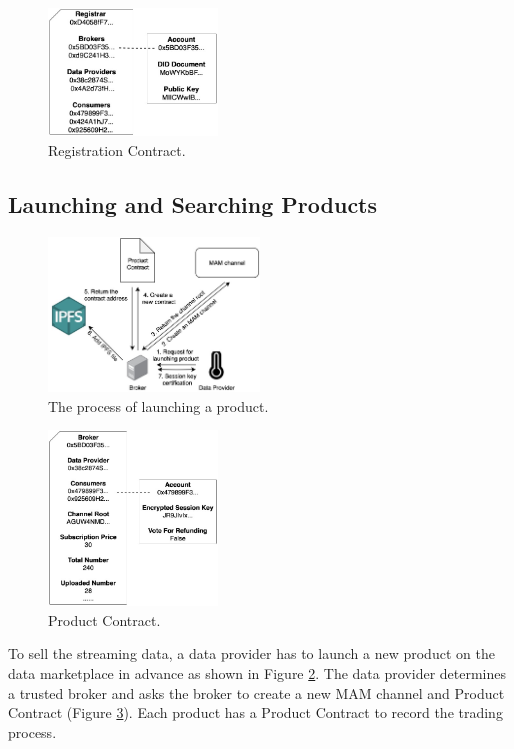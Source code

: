 \documentclass[journal,a4paper]{IEEEtran}
\begin{document}
\begin{figure}[h]
	\centering
	\includegraphics[width=0.4\textwidth]{registration_contract}
	\caption{Registration Contract.}
	\label{fig:registration_contract}
\end{figure}

\subsection{Launching and Searching Products}

\begin{figure}[h]
	\centering
	\includegraphics[width=0.5\textwidth]{launching_product}
	\caption{The process of launching a product.}
	\label{fig:launching_product}
\end{figure}

\begin{figure}[h]
	\centering
	\includegraphics[width=0.4\textwidth]{product_contract}
	\caption{Product Contract.}
	\label{fig:product_contract}
\end{figure}

To sell the streaming data, a data provider has to launch a new product on the data marketplace in advance as shown in Figure \ref{fig:launching_product}. The data provider determines a trusted broker and asks the broker to create a new MAM channel and Product Contract (Figure \ref{fig:product_contract}). Each product has a Product Contract to record the trading process.
\end{document}
